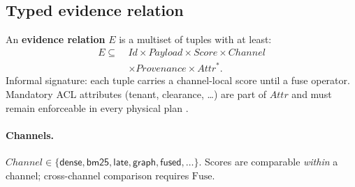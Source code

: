 \subsection{Typed evidence relation}
An \textbf{evidence relation} $E$ is a multiset of tuples with at least:
\begin{align*}
E \subseteq\ &\mathit{Id} \times \mathit{Payload} \times \mathit{Score} \times \mathit{Channel}\\
&\times \mathit{Provenance} \times \mathit{Attr}^* .
\end{align*}
Informal signature: each tuple carries a channel-local score until a fuse operator.
Mandatory ACL attributes (tenant, clearance, \ldots) are part of $\mathit{Attr}$ and must remain enforceable in every physical plan \hypothesis{}.

\paragraph{Channels.}
$\mathit{Channel}\in\{\mathsf{dense},\mathsf{bm25},\mathsf{late},\mathsf{graph},\mathsf{fused},\ldots\}$.
Scores are comparable \emph{within} a channel; cross-channel comparison requires $\mathrm{Fuse}$.

